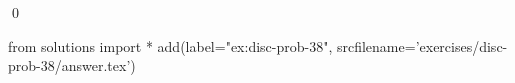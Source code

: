 
\begin{ex} 
  \label{ex:disc-prob-38}
  
  \qed
\end{ex} 
\begin{python0}
from solutions import *
add(label="ex:disc-prob-38",
    srcfilename='exercises/disc-prob-38/answer.tex') 
\end{python0}
